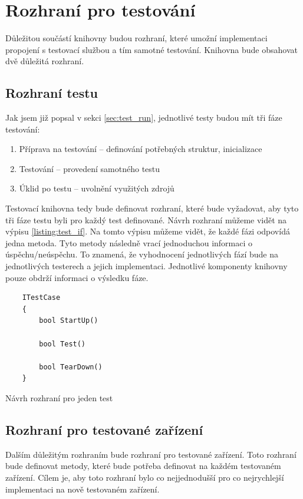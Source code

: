\section{Rozhraní pro testování}
Důležitou součástí knihovny budou rozhraní, které umožní implementaci propojení s testovací službou a tím samotné testování. Knihovna bude obsahovat dvě důležitá rozhraní. 

\subsection{Rozhraní testu}
Jak jsem již popsal v sekci \ref{sec:test_run}, jednotlivé testy budou mít tři fáze testování:

\begin{enumerate}
    \item Příprava na testování -- definování potřebných struktur, inicializace
    \item Testování -- provedení samotného testu
    \item Úklid po testu -- uvolnění využitých zdrojů
\end{enumerate}

Testovací knihovna tedy bude definovat rozhraní, které bude vyžadovat, aby tyto tři fáze testu byli pro každý test definované. Návrh rozhraní můžeme vidět na výpisu \ref{listing:test_if}. Na tomto výpisu můžeme vidět, že každé fázi odpovídá jedna metoda. Tyto metody následně vrací jednoduchou informaci o úspěchu/neúspěchu. To znamená, že vyhodnocení jednotlivých fází bude na jednotlivých testerech a jejich implementaci. Jednotlivé komponenty knihovny pouze obdrží informaci o výsledku fáze.

\begin{listing}[htbp]
    \begin{verbatim}
    ITestCase 
    {
        bool StartUp()

        bool Test()

        bool TearDown()
    }
    \end{verbatim}
\caption{Návrh rozhraní pro jeden test}
\label{listing:test_if}
\end{listing}



\subsection{Rozhraní pro testované zařízení}

Dalším důležitým rozhraním bude rozhraní pro testované zařízení. Toto rozhraní bude definovat metody, které bude potřeba definovat na každém testovaném zařízení. Cílem je, aby toto rozhraní bylo co nejjednodušší pro co nejrychlejší implementaci na nově testovaném zařízení.

